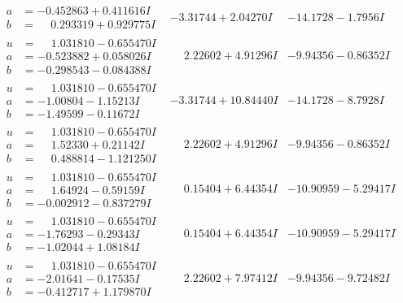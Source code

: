 \documentclass[1p]{elsarticle_modified}
\theoremstyle{definition}
\begin{document}
$$\begin{array}{c|c|c}
\begin{aligned}
a &= -0.452863 + 0.411616 I \\
b &= \phantom{-}0.293319 + 0.929775 I\end{aligned}
 & -3.31744 + 2.04270 I & -14.1728 - 1.7956 I \\ \hline\begin{aligned}
u &= \phantom{-}1.031810 - 0.655470 I \\
a &= -0.523882 + 0.058026 I \\
b &= -0.298543 - 0.084388 I\end{aligned}
 & \phantom{-}2.22602 + 4.91296 I & -9.94356 - 0.86352 I \\ \hline\begin{aligned}
u &= \phantom{-}1.031810 - 0.655470 I \\
a &= -1.00804 - 1.15213 I \\
b &= -1.49599 - 0.11672 I\end{aligned}
 & -3.31744 + 10.84440 I & -14.1728 - 8.7928 I \\ \hline\begin{aligned}
u &= \phantom{-}1.031810 - 0.655470 I \\
a &= \phantom{-}1.52330 + 0.21142 I \\
b &= \phantom{-}0.488814 - 1.121250 I\end{aligned}
 & \phantom{-}2.22602 + 4.91296 I & -9.94356 - 0.86352 I \\ \hline\begin{aligned}
u &= \phantom{-}1.031810 - 0.655470 I \\
a &= \phantom{-}1.64924 - 0.59159 I \\
b &= -0.002912 - 0.837279 I\end{aligned}
 & \phantom{-}0.15404 + 6.44354 I & -10.90959 - 5.29417 I \\ \hline\begin{aligned}
u &= \phantom{-}1.031810 - 0.655470 I \\
a &= -1.76293 - 0.29343 I \\
b &= -1.02044 + 1.08184 I\end{aligned}
 & \phantom{-}0.15404 + 6.44354 I & -10.90959 - 5.29417 I \\ \hline\begin{aligned}
u &= \phantom{-}1.031810 - 0.655470 I \\
a &= -2.01641 - 0.17535 I \\
b &= -0.412717 + 1.179870 I\end{aligned}
 & \phantom{-}2.22602 + 7.97412 I & -9.94356 - 9.72482 I \\ \hline\begin{aligned}

\end{aligned}
\end{array}$$
\end{document}
